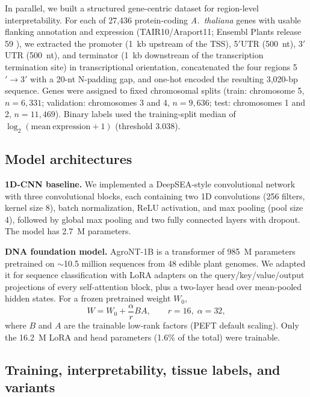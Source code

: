 \documentclass[9pt,twocolumn,twoside,lineno]{gsag3jnl}
\begin{document}
In parallel, we built a structured gene-centric dataset for region-level interpretability. For each of 27,436 protein-coding \emph{A.\ thaliana} genes with usable flanking annotation and expression (TAIR10/Araport11; Ensembl Plants release 59 \citep{agi2000,lamesch2012,harrison2024}), we extracted the promoter (1~kb upstream of the TSS), 5$'$UTR (500~nt), 3$'$UTR (500~nt), and terminator (1~kb downstream of the transcription termination site) in transcriptional orientation, concatenated the four regions 5$'\rightarrow$3$'$ with a 20-nt N-padding gap, and one-hot encoded the resulting 3,020-bp sequence. Genes were assigned to fixed chromosomal splits (train: chromosome 5, $n=6{,}331$; validation: chromosomes 3 and 4, $n=9{,}636$; test: chromosomes 1 and 2, $n=11{,}469$). Binary labels used the training-split median of $\log_2(\mathrm{mean\ expression}+1)$ (threshold 3.038).

\subsection{Model architectures}

\textbf{1D-CNN baseline.} We implemented a DeepSEA-style convolutional network \citep{zhou2015} with three convolutional blocks, each containing two 1D convolutions (256 filters, kernel size 8), batch normalization, ReLU activation, and max pooling (pool size 4), followed by global max pooling and two fully connected layers with dropout. The model has 2.7~M parameters.

\textbf{DNA foundation model.} AgroNT-1B \citep{mendoza2024} is a transformer of 985~M parameters pretrained on $\sim$10.5 million sequences from 48 edible plant genomes. We adapted it for sequence classification with LoRA adapters \citep{hu2021lora} on the query/key/value/output projections of every self-attention block, plus a two-layer head over mean-pooled hidden states. For a frozen pretrained weight $W_0$,
\begin{equation}
W=W_0+\frac{\alpha}{r}BA,\qquad r=16,\;\alpha=32,
\label{eq:lora}
\end{equation}
where $B$ and $A$ are the trainable low-rank factors (PEFT default scaling). Only the 16.2~M LoRA and head parameters (1.6\% of the total) were trainable.

\subsection{Training, interpretability, tissue labels, and variants}
\end{document}
